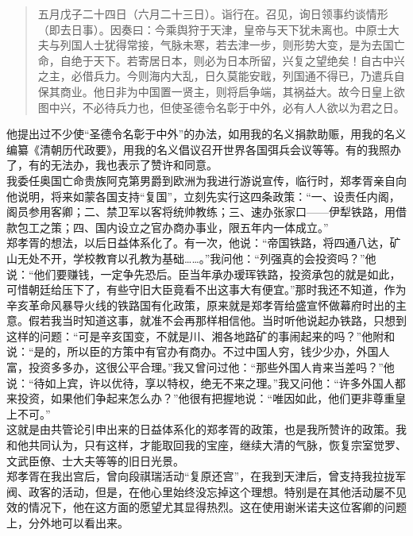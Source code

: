 \begin{quote}
	五月戊子二十四日（六月二十三日）。诣行在。召见，询日领事约谈情形（即去日事）。因奏曰：今乘舆狩于天津，皇帝与天下犹未离也。中原士大夫与列国人士犹得常接，气脉未寒，若去津一步，则形势大变，是为去国亡命，自绝于天下。若寄居日本，则必为日本所留，兴复之望绝矣！自古中兴之主，必借兵力。今则海内大乱，日久莫能安戢，列国通不得已，乃遣兵自保其商业。他日非为中国置一贤主，则将启争端，其祸益大。故今日皇上欲图中兴，不必待兵力也，但使圣德令名彰于中外，必有人人欲以为君之日。\\
\end{quote}

他提出过不少使“圣德令名彰于中外”的办法，如用我的名义捐款助赈，用我的名义编纂《清朝历代政要》，用我的名义倡议召开世界各国弭兵会议等等。有的我照办了，有的无法办，我也表示了赞许和同意。\\

我委任奥国亡命贵族阿克第男爵到欧洲为我进行游说宣传，临行时，郑孝胥亲自向他说明，将来如蒙各国支持“复国”，立刻先实行这四条政策：“一、设责任内阁，阁员参用客卿；二、禁卫军以客将统帅教练；三、速办张家口——伊犁铁路，用借款包工之策；四、国内设立之官办商办事业，限五年内一体成立。”\\

郑孝胥的想法，以后日益体系化了。有一次，他说：“帝国铁路，将四通八达，矿山无处不开，学校教育以孔教为基础……。”我问他：“列强真的会投资吗？”他说：“他们要赚钱，一定争先恐后。臣当年承办瑷珲铁路，投资承包的就是如此，可惜朝廷给压下了，有些守旧大臣竟看不出这事大有便宜。”那时我还不知道，作为辛亥革命风暴导火线的铁路国有化政策，原来就是郑孝胥给盛宣怀做幕府时出的主意。假若我当时知道这事，就准不会再那样相信他。当时听他说起办铁路，只想到这样的问题：“可是辛亥国变，不就是川、湘各地路矿的事闹起来的吗？”他附和说：“是的，所以臣的方策中有官办有商办。不过中国人穷，钱少少办，外国人富，投资多多办，这很公平合理。”我又曾问过他：“那些外国人肯来当差吗？”他说：“待如上宾，许以优待，享以特权，绝无不来之理。”我又问他：“许多外国人都来投资，如果他们争起来怎么办？”他很有把握地说：“唯因如此，他们更非尊重皇上不可。”\\

这就是由共管论引申出来的日益体系化的郑孝胥的政策，也是我所赞许的政策。我和他共同认为，只有这样，才能取回我的宝座，继续大清的气脉，恢复宗室觉罗、文武臣僚、士大夫等等的旧日光景。\\

郑孝胥在我出宫后，曾向段祺瑞活动“复原还宫”，在我到天津后，曾支持我拉拢军阀、政客的活动，但是，在他心里始终没忘掉这个理想。特别是在其他活动屡不见效的情况下，他在这方面的愿望尤其显得热烈。这在使用谢米诺夫这位客卿的问题上，分外地可以看出来。\\

